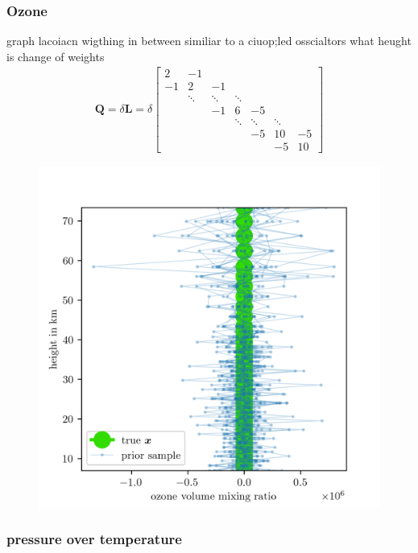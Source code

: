 \subsubsection{Ozone}
graph lacoiacn 
wigthing in between
similiar to a ciuop;led osscialtors
what heught is change of weights
\begin{align}
	\bm{Q}= \delta \bm{L} =
	\delta
	\begin{bmatrix}
		2 & -1 & & &  \\
		-1 & 2 & -1 & &   \\
		& \ddots & \ddots & \ddots &\\ 
		&   & -1 & 6 & -5 \\
		& & & \ddots & \ddots & \ddots  \\ 
		& & & &  -5 & 10 & -5 \\
		& & & & & -5 & 10 
	\end{bmatrix}  
\end{align}
\begin{figure}[ht!]
	\centering
	\includegraphics{OzonePrior.png}
	\caption[]{}
	\label{fig:}
\end{figure}
\subsubsection{pressure over temperature}


